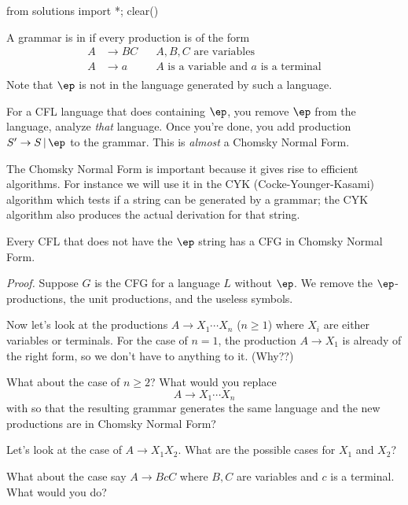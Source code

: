 \begin{python0}
from solutions import *; clear()
\end{python0}

A grammar is in  if every production
is of the form
\begin{align*}
 A &\rightarrow BC &\,\,\,\,\,\text{$A,B,C$ are variables} \\
 A &\rightarrow a  &\,\,\,\,\,\text{$A$ is a variable and $a$ is a
 terminal} \\
\end{align*}
Note that $\ep$ is not in the language generated by such a
language.

For a CFL language that does containing $\ep$, you remove $\ep$ from the
language, analyze \textit{ that} language. Once you're done, you add
production $S' \rightarrow S\,|\, \ep$ to the grammar. This is
\textit{ almost} a Chomsky Normal Form.


The Chomsky Normal Form is important because it gives rise to
efficient algorithms. For instance we will use it in the CYK
(Cocke-Younger-Kasami) algorithm which tests if a string can be
generated by a grammar; the CYK algorithm also produces the actual
derivation for that string.

\begin{thm} Every CFL that does not have the $\ep$ string has a
CFG in Chomsky Normal Form.
\end{thm}

\textit{ Proof.}
Suppose $G$ is the CFG for a language $L$ without $\ep$. We remove
the $\ep$-productions, the unit productions, and the useless
symbols.

Now let's look at the productions $A \rightarrow X_1 \cdots X_n$
($n\geq 1$) where $X_i$ are either variables or terminals. 
For the case of $n=1$, the production $A \rightarrow
X_1$ is already of the right form, so we don't have to anything to
it. (Why??)

What about the case of $n \geq 2$? What would you replace
\[
 A \rightarrow X_1 \cdots X_n
\]
with so that the resulting grammar generates the same language and
the new productions are in Chomsky Normal Form?

Let's look at the case of $A \rightarrow X_1 X_2$. What are the
possible cases for $X_1$ and $X_2$?

What about the case say $A \rightarrow BcC$ where $B,C$ are
variables and $c$ is a terminal. What would you do?

